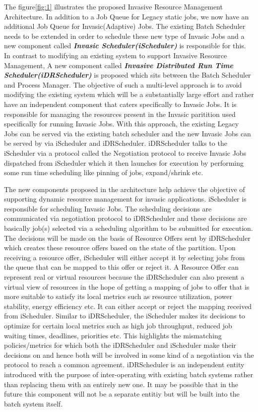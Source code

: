 The figure\ref{fig:1} illustrates the proposed Invasive Resource Management Architecture. In addition to a Job Queue for Legacy static jobs, we now have an additional Job Queue for Invasic(Adaptive) Jobs. The existing Batch Scheduler needs to be extended in order to schedule these new type of Invasic Jobs and a new component called \textbf{\textit{Invasic Scheduler(iScheduler)}} is responsible for this. In contrast to modifying an existing system to support Invasive Resource Management, A new component called \textbf{\textit{Invasive Distributed Run Time Scheduler(iDRScheduler)}} is proposed which sits between the Batch Scheduler and Process Manager. The objective of such a multi-level approach is to avoid modifying the existing system which will be a substantially large effort and rather have an independent component that caters specifically to Invasic Jobs. It is responsible for managing the resources present in the Invasic paritition used specifically for running Invasic Jobs. With this approach, the existing Legacy Jobs can be served via the existing batch scheduler and the new Invasic Jobs can be served by via iScheduler and iDRScheduler. iDRScheduler talks to the iScheduler via a protocol called the Negotiation protocol to receive Invasic Jobs dispatched from iScheduler which it then launches for execution by performing some run time scheduling like pinning of jobs, expand/shrink etc.\\ \par
\noindent
The new components proposed in the architecture help achieve the objective of supporting dynamic resource management for invasic applications. iScheduler is responsible for scheduling Invasic Jobs. The scheduling decisions are communicated via negotiation protocol to iDRScheduler and these decisions are basically job(s) selected via a scheduling algorithm to be submitted for execution. The decisions will be made on the basis of Resource Offers sent by iDRScheduler which creates these resource offers based on the state of the partition. Upon receiving a resource offer, iScheduler will either accept it by selecting jobs from the queue that can be mapped to this offer or reject it. A Resource Offer can represent real or virtual resources because the iDRScheduler can also present a virtual view of resources in the hope of getting a mapping of jobs to offer that is more suitable to satisfy its local metrics such as resource utilization, power stability, energy efficiency etc. It can either accept or reject the mapping received from iScheduler. Similar to iDRScheduler, the iScheduler makes its decisions to optimize for certain local metrics such as high job throughput, reduced job waiting times, deadlines, priorities etc. This highlights the mismatching policies/metrics for which both the iDRScheduler and iScheduler make their decisions on and hence both will be involved in some kind of a negotiation via the protocol to reach a common agreement. iDRScheduler is an independent entity introduced with the purpose of inter-operating with existing batch systems rather than replacing them with an entirely new one. It may be possible that in the future this component will not be a separate entitiy but will be built into the batch system itself.\\ \par

